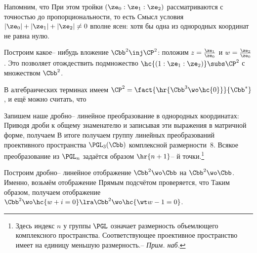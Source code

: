 \documentclass[a4paper]{article}
\begin{document}
Напомним, что
При этом тройки $(\ze_0:\ze_1:\ze_2)$ рассматриваются с точностью до пропорциональности, то есть
Смысл условия $|\ze_0| + |\ze_1| + |\ze_2| \neq 0$ вполне ясен: хотя бы одна из однородных
координат не равна нулю.

Построим какое-- нибудь вложение $\Cbb^2 \inj \CP^2$: положим
$z = \frac{\ze_1}{\ze_0}$ и $w = \frac{\ze_2}{\ze_0}$. Это позволяет отождествить
подмножество $\hc{(1:\ze_1:\ze_2)} \subs \CP^2$ с множеством $\Cbb^2$.

В алгебраических терминах имеем
$\CP^2 = \fact{\hr{\Cbb^3\wo\hc{0}}}{\Cbb^*}$, и ещё можно считать, что

Запишем наше дробно-- линейное преобразование в однородных координатах:
Приводя дроби к общему знаменателю и записывая эти выражения  в матричной форме, получаем
В итоге получаем группу линейных преобразований проективного пространства $\PGL_3(\Cbb)$
комплексной размерности~8. Всякое преобразование из $\PGL_n$ задаётся образом
$\hr{n+1}$-- й точки.\footnote{Здесь индекс $n$ у группы $\PGL$ означает размерность объемлющего
комплексного пространства. Соответствующее проективное пространство
имеет на единицу меньшую размерность.-- \emph{Прим. наб.}}

\medskip

Построим дробно-- линейное отображение $\Cbb^2 \wo \Cbb$ на $\Cbb^2 \wo \Cbb$.
Именно, возьмём отображение
Прямым подсчётом проверяется, что
Таким образом, получаем отображение $\Cbb^2 \wo \hc{w + i = 0} \lra \Cbb^2 \wo \hc{\wt w - 1 = 0}$.
\end{document}
